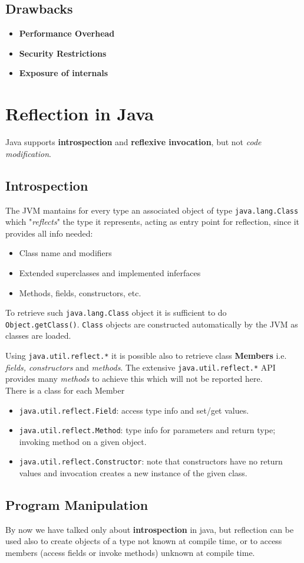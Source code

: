 \subsection{Drawbacks}
\begin{itemize}
    \item \textbf{Performance Overhead}
    \item \textbf{Security Restrictions}
    \item \textbf{Exposure of internals}
\end{itemize}

\section{Reflection in Java}
Java supports \textbf{introspection} and \textbf{reflexive invocation},
but not \textit{code modification}.

\subsection{Introspection}

The JVM mantains for every type an associated object of type \lstinline{java.lang.Class} which "\textit{reflects}" the type it represents,
acting as entry point for reflection,
since it provides all info needed:
\begin{itemize}
    \item Class name and modifiers
    \item Extended superclasses and implemented inferfaces
    \item Methods, fields, constructors, etc.
\end{itemize}

To retrieve such \lstinline{java.lang.Class} object it is sufficient to do \lstinline{Object.getClass()}.
\lstinline{Class} objects are constructed automatically by the JVM as classes are loaded.

Using \lstinline{java.util.reflect.*} it is possible also to retrieve class \textbf{Members} i.e. \textit{fields, constructors} and \textit{methods}.
The extensive \lstinline{java.util.reflect.*} API provides many \textit{methods} to achieve this which will not be reported here.\\
There is a class for each Member
\begin{itemize}
    \item \lstinline{java.util.reflect.Field}: access type info and set/get values.
    \item \lstinline{java.util.reflect.Method}: type info for parameters and return type;
    invoking method on a given object.
    \item \lstinline{java.util.reflect.Constructor}: note that constructors have no return values and invocation creates a new instance of the given class.
\end{itemize}

\subsection{Program Manipulation}
By now we have talked only about \textbf{introspection} in java,
but reflection can be used also to create objects of a type not known at compile time,
or to access members (access fields or invoke methods) unknown at compile time.

